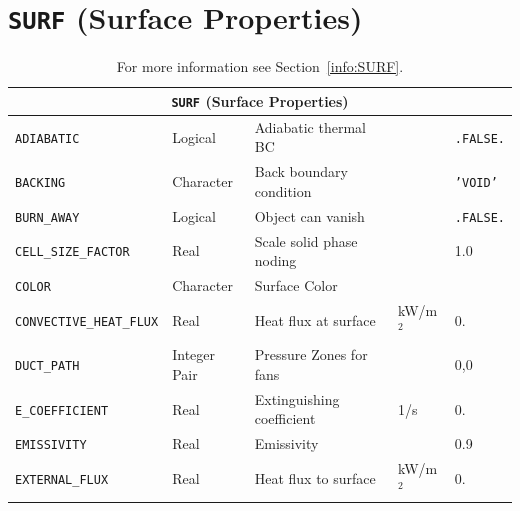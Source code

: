\documentclass[11pt]{book}
\newcommand{\ct}{\tt\small}
\begin{document}
\vspace{\baselineskip}

\vfill


\section{\texorpdfstring{{\tt SURF}}{SURF} (Surface Properties)}

\begin{longtable}{|l|l|l|l|l|}
\caption[  ]{For more information see Section~\ref{info:SURF}.}
\label{tbl:SURF} \\
\hline
\multicolumn{5}{|c|}{{\ct SURF} (Surface Properties)} \\ \hline \hline
{\ct ADIABATIC}                       & Logical         & Adiabatic thermal BC              &                     & {\ct .FALSE.}           \\ \hline
{\ct BACKING}                         & Character       & Back boundary condition           &                     & {\ct 'VOID'}            \\ \hline
{\ct BURN\_AWAY}                      & Logical         & Object can vanish                 &                     & {\ct .FALSE.}           \\ \hline
{\ct CELL\_SIZE\_FACTOR}              & Real            & Scale solid phase noding          &                     & 1.0                     \\ \hline
{\ct COLOR    }                       & Character       & Surface Color                     &                     &                         \\ \hline
{\ct CONVECTIVE\_HEAT\_FLUX}          & Real            & Heat flux at surface              & kW/m$^2$            & 0.                      \\ \hline
{\ct DUCT\_PATH}                      & Integer Pair    & Pressure Zones for fans           &                     & 0,0                     \\ \hline
{\ct E\_COEFFICIENT}                  & Real            & Extinguishing coefficient         & 1/s                 & 0.                      \\ \hline
{\ct EMISSIVITY}                      & Real            & Emissivity                        &                     & 0.9                     \\ \hline
{\ct EXTERNAL\_FLUX}                  & Real            & Heat flux to surface              & kW/m$^2$            & 0.                      \\ \hline

\end{longtable}
\end{document}

